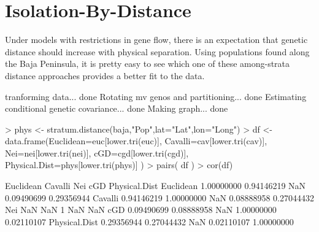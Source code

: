\documentclass[letterpaper,twoside,openany]{book}
\begin{document}
\section{Isolation-By-Distance}


Under models with restrictions in gene flow, there is an expectation that genetic distance should increase with physical separation.  Using populations found along the Baja Peninsula, it is pretty easy to see which one of these among-strata distance approaches provides a better fit to the data.

\begin{Schunk}
\begin{Soutput}
tranforming data... done
Rotating mv genos and partitioning...  done
Estimating conditional genetic covariance... done
Making graph... done
\end{Soutput}
\begin{Sinput}
> phys <- stratum.distance(baja,"Pop",lat="Lat",lon="Long")
> df <- data.frame(Euclidean=euc[lower.tri(euc)], Cavalli=cav[lower.tri(cav)], Nei=nei[lower.tri(nei)], cGD=cgd[lower.tri(cgd)], Physical.Dist=phys[lower.tri(phys)] )
> pairs( df )
> cor(df)
\end{Sinput}
\begin{Soutput}
               Euclidean    Cavalli Nei        cGD Physical.Dist
Euclidean     1.00000000 0.94146219 NaN 0.09490699    0.29356944
Cavalli       0.94146219 1.00000000 NaN 0.08888958    0.27044432
Nei                  NaN        NaN   1        NaN           NaN
cGD           0.09490699 0.08888958 NaN 1.00000000    0.02110107
Physical.Dist 0.29356944 0.27044432 NaN 0.02110107    1.00000000
\end{Soutput}
\end{Schunk}
\end{document}

